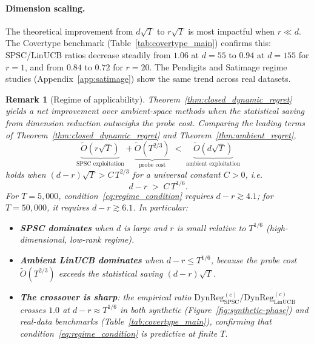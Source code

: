 \documentclass{article}
\newcommand{\DynReg}{\mathrm{DynReg}}
\newtheorem{remark}{Remark}
\begin{document}
\paragraph{Dimension scaling.}
  The theoretical improvement from $d\sqrt{T}$ to $r\sqrt{T}$ is most impactful when $r \ll d$.
  The Covertype benchmark (Table~\ref{tab:covertype_main}) confirms this: SPSC/LinUCB ratios decrease steadily from $1.06$ at
  $d{=}55$ to $0.94$ at $d{=}155$ for $r{=}1$, and from $0.84$ to $0.72$ for $r{=}20$. The Pendigits and Satimage regime studies
  (Appendix~\ref{app:satimage}) show the same trend across real datasets.

 \begin{remark}[Regime of applicability]
  \label{rem:regime}
  Theorem~\ref{thm:closed_dynamic_regret} yields a net improvement over ambient-space methods when the statistical saving from
  dimension reduction outweighs the probe cost. Comparing the leading terms of Theorem~\ref{thm:closed_dynamic_regret} and
  Theorem~\ref{thm:ambient_regret},
  \[
    \underbrace{\widetilde{O}(r\sqrt{T})}_{\text{SPSC exploitation}}
    +
    \underbrace{\widetilde{O}(T^{2/3})}_{\text{probe cost}}
    \;<\;
    \underbrace{\widetilde{O}(d\sqrt{T})}_{\text{ambient exploitation}}
  \]
  holds when $(d-r)\sqrt{T} > C\,T^{2/3}$ for a universal constant $C>0$, i.e.\
  \begin{equation}
    d - r \;>\; C\,T^{1/6}.
    \label{eq:regime_condition}
  \end{equation}
  For $T = 5{,}000$, condition~\eqref{eq:regime_condition} requires $d - r \gtrsim 4.1$; for $T = 50{,}000$, it requires $d - r
  \gtrsim 6.1$. In particular:
  \begin{itemize}[nosep]
    \item \textbf{SPSC dominates} when $d$ is large and $r$ is small relative to $T^{1/6}$ (high-dimensional, low-rank regime).
    \item \textbf{Ambient LinUCB dominates} when $d - r \leq T^{1/6}$, because the probe cost $\widetilde{O}(T^{2/3})$ exceeds the
  statistical saving $(d-r)\sqrt{T}$.
    \item \textbf{The crossover is sharp}: the empirical ratio $\DynReg^{(c)}_{\mathrm{SPSC}}/\DynReg^{(c)}_{\mathrm{LinUCB}}$
  crosses $1.0$ at $d - r \approx T^{1/6}$ in both synthetic (Figure~\ref{fig:synthetic-phase}) and real-data benchmarks
  (Table~\ref{tab:covertype_main}), confirming that condition~\eqref{eq:regime_condition} is predictive at finite $T$.
  \end{itemize}
  \end{remark}
\end{document}
